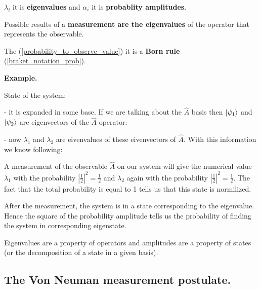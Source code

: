 \documentclass{article}
\begin{document}

$\lambda_i$ it is \textbf{eigenvalues} and $\alpha_i$ it is \textbf{probablity amplitudes}.

Possible results of a \textbf{measurement are the eigenvalues} of the operator that represents the observable.



The (\ref{probability_to_observe_value}) it is a \textbf{Born rule} (\ref{braket_notation_prob}).

\textbf{Example.}

State of the system:


- it is expanded in some base. If we are talking about the $\hat{A}$ basis then $\ket{\psi_1}$ and $\ket{\psi_2}$ are eigenvectors of the $\hat{A}$ operator:


- now $\lambda_1$ and $\lambda_2$ are eivenvalues of these eivenvectors of $\hat{A}$. With this information we know following:

A measurement of the observable $\hat{A}$ on our system will give the numerical value $\lambda_1$ with the probability
$|\frac{1}{2}|^2 = \frac{1}{2}$ and $\lambda_2$ again with the probability $|\frac{1}{2}|^2 = \frac{1}{2}$. The fact that the total probability is equal to 1 tells us that this state is normilized.

After the measurement, the system is in a state corresponding to the eigenvalue. Hence the square of the probability amplitude tells us the probability of finding the system in corresponding eigenstate.

Eigenvalues are a property of operators and amplitudes are a property of states (or the decomposition of a state in a given basis).


\subsection{The Von Neuman measurement postulate.}
\end{document}
